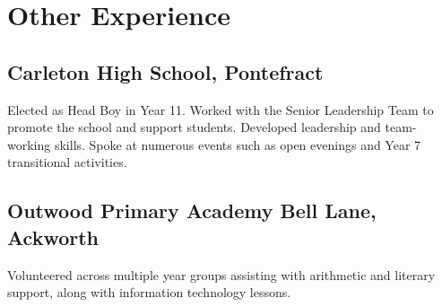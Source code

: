 \documentclass[9pt]{extarticle}
\begin{document}
\begin{minipage}{0.65\textwidth}
	\section{Other Experience}
	\subsection{Carleton High School, Pontefract}
	Elected as Head Boy in Year 11. Worked with the Senior Leadership Team to promote the school and support students. Developed leadership and team-working skills. Spoke at numerous events such as open evenings and Year 7 transitional activities.


	\subsection{Outwood Primary Academy Bell Lane, Ackworth}
	Volunteered across multiple year groups assisting with arithmetic and literary support, along with information technology lessons.

\end{minipage}
\hspace{0.5cm}
\end{document}
